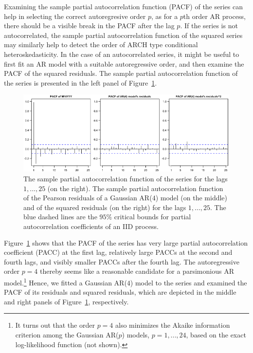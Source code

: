 \documentclass[nojss]{jss} %
\begin{document}
Examining the sample partial autocorrelation function (PACF) of the series can help in selecting the correct autoregresive order $p$, as for a $p$th order AR process, there should be a visible break in the PACF after the lag $p$. If the series is not autocorrelated, the sample partial autocorrelation function of the squared series may similarly help to detect the order of ARCH type conditional heteroskedasticity. In the case of an autocorrelated series, it might be useful to first fit an AR model with a suitable autoregressive order, and then examine the PACF of the squared residuals.
The sample partial autocorrelation function of the series  \citep[calculated using the function  from the package ,][]{R} is presented in the left panel of Figure~\ref{fig:pacf}.
%
\begin{figure}
  \centering
  \includegraphics{figures/pacfplot.png}
  \caption{The sample partial autocorrelation function of the series  for the lags $1,...,25$ (on the right). The sample partial autocorrelation function of the Pearson residuals of a Gaussian AR($4$) model (on the middle) and of the squared residuals (on the right) for the lags $1,...,25$. The blue dashed lines are the $95\%$ critical bounds for partial autocorrelation coefficients of an IID process.}
\label{fig:pacf}
\end{figure}
%

Figure~\ref{fig:pacf} shows that the PACF of the series has very large partial autocorrelation coefficient (PACC) at the first lag, relatively large PACCs at the second and fourth lags, and visibly smaller PACCs after the fourth lag. The autoregressive order $p=4$ thereby seems like a reasonable candidate for a parsimonious AR model.\footnote{It turns out that the order $p=4$ also minimizes the Akaike information criterion among the Gaussian AR($p$) models, $p=1,...,24$, based on the exact log-likelihood function (not shown).} Hence, we fitted a Gaussian AR($4$) model to the series and examined the PACF of its residuals and squared residuals, which are depicted in the middle and right panels of Figure~\ref{fig:pacf}, respectively.
\end{document}
